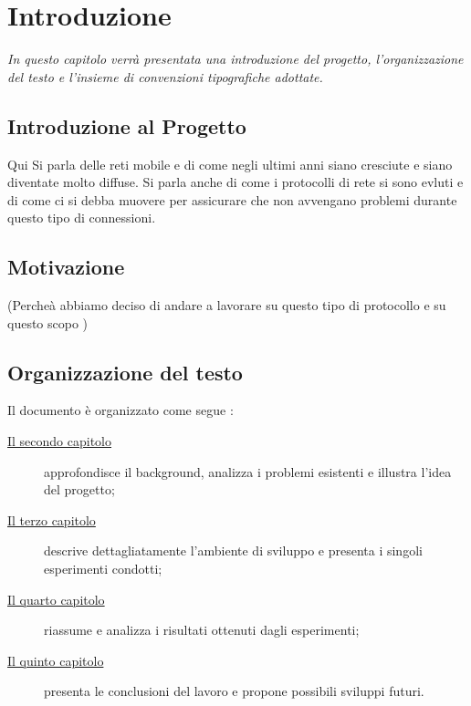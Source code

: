 \chapter{Introduzione}
\label{cap:introduzione}

\textit{\indent In questo capitolo verrà presentata una introduzione del progetto, l'organizzazione del testo e l'insieme di convenzioni tipografiche adottate.
}
\section{Introduzione al Progetto}

Qui Si parla delle reti mobile e di come negli ultimi anni siano cresciute e siano diventate molto diffuse. Si parla anche di come i protocolli di rete si sono evluti e di come ci si debba muovere per assicurare che non avvengano problemi durante questo tipo di connessioni. 


\section{Motivazione}

(Percheà abbiamo deciso di andare a lavorare su questo tipo di protocollo e su questo scopo )
\section{Organizzazione del testo}

\indent Il documento è organizzato come segue :
\begin{description}
    \item[{\hyperref[cap:descrizione]{Il secondo capitolo}}] approfondisce il background, analizza i problemi esistenti e illustra l'idea del progetto;
    
    \item[{\hyperref[cap:processi-metodologie]{Il terzo capitolo}}] descrive dettagliatamente l'ambiente di sviluppo e presenta i singoli esperimenti condotti;

    \item[{\hyperref[cap:risultati]{Il quarto capitolo}}] riassume e analizza i risultati ottenuti dagli esperimenti;
    
    \item[{\hyperref[cap:conclusioni]{Il quinto capitolo}}] presenta le conclusioni del lavoro e propone possibili sviluppi futuri.
\end{description}


